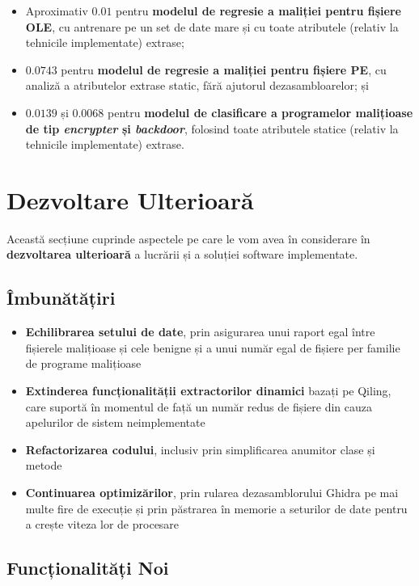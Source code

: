 \documentclass[../../main.tex]{subfiles}
\begin{document}
\begin{itemize}
    \item Aproximativ $ 0.01 $ pentru \textbf{modelul de regresie a maliției pentru fișiere OLE}, cu antrenare pe un set de date mare și cu toate atributele (relativ la tehnicile implementate) extrase;
    \item $ 0.0743 $ pentru \textbf{modelul de regresie a maliției pentru fișiere PE}, cu analiză a atributelor extrase static, fără ajutorul dezasambloarelor; și
    \item $ 0.0139 $ și $ 0.0068 $ pentru \textbf{modelul de clasificare a programelor maliți\-oase de tip \textit{encrypter} și \textit{backdoor}}, folosind toate atributele statice (relativ la tehnicile implementate) extrase.
\end{itemize}

\section{Dezvoltare Ulterioară}
\label{sec:conclusions_further_dev}

Această secțiune cuprinde aspectele pe care le vom avea în considerare în \textbf{dezvoltarea ulterioară} a lucrării și a soluției software implementate.

\subsection{Îmbunătățiri}

\begin{itemize}
    \item \textbf{Echilibrarea setului de date}, prin asigurarea unui raport egal între fișierele malițioase și cele benigne și a unui număr egal de fișiere per familie de programe malițioase
    \item \textbf{Extinderea funcționalității extractorilor dinamici} bazați pe Qiling, care suportă în momentul de față un număr redus de fișiere din cauza apelurilor de sistem neimplementate
    \item \textbf{Refactorizarea codului}, inclusiv prin simplificarea anumitor clase și metode
    \item \textbf{Continuarea optimizărilor}, prin rularea dezasamblorului Ghidra pe mai multe fire de execuție și prin păstrarea în memorie a seturilor de date pentru a crește viteza lor de procesare
\end{itemize}

\subsection{Funcționalități Noi}
\end{document}
